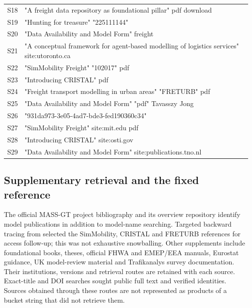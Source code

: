 \begin{longtable}{@{}p{.08\linewidth}p{.86\linewidth}@{}}
S18 & "A freight data repository as foundational pillar" pdf download \\[.4em]

S19 & "Hunting for treasure" "225111144" \\[.4em]

S20 & "Data Availability and Model Form" freight \\[.4em]

S21 & "A conceptual framework for agent-based modelling of logistics services" site:utoronto.ca \\[.4em]

S22 & "SimMobility Freight" "102017" pdf \\[.4em]

S23 & "Introducing CRISTAL" pdf \\[.4em]

S24 & "Freight transport modelling in urban areas" "FRETURB" pdf \\[.4em]

S25 & "Data Availability and Model Form" "pdf" Tavasszy Jong \\[.4em]

S26 & "931da973-3e05-4ad7-bde3-fed190360c34" \\[.4em]

S27 & "SimMobility Freight" site:mit.edu pdf \\[.4em]

S28 & "Introducing CRISTAL" site:osti.gov \\[.4em]

S29 & "Data Availability and Model Form" site:publications.tno.nl \\[.4em]

\bottomrule\end{longtable}

\subsection{Supplementary retrieval and the fixed reference}
The official MASS-GT project bibliography and its overview repository identify
model publications in addition to model-name searching. Targeted backward
tracing from \textcite{massgt2025} selected the SimMobility, CRISTAL and FRETURB
references for access follow-up; this was not exhaustive snowballing. Other
supplements include foundational books, theses, official FHWA and EMEP/EEA
manuals, Eurostat guidance, UK model-review material and Trafikanalys survey
documentation. Their institutions, versions and retrieval routes are retained
with each source. Exact-title and DOI searches sought public full text and
verified identities. Sources obtained through these routes are not represented
as products of a bucket string that did not retrieve them.

